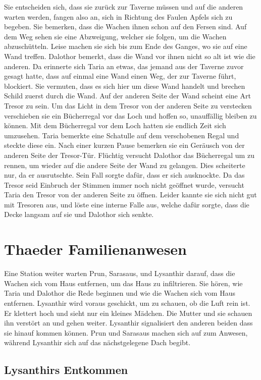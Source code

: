 \documentclass[10pt,twoside,twocolumn,openany]{book}
\begin{document}
	Sie entscheiden sich, dass sie zurück zur Taverne müssen und auf die anderen warten werden, fangen also an, sich in Richtung des Faulen Apfels sich zu begeben. Sie bemerken, dass die Wachen ihnen schon auf den Fersen sind. Auf dem Weg sehen sie eine Abzweigung, welcher sie folgen, um die Wachen abzuschütteln. Leise machen sie sich bis zum Ende des Ganges, wo sie auf eine Wand treffen. Dalothor bemerkt, dass die Wand vor ihnen nicht so alt ist wie die anderen. Da erinnerte sich Taria an etwas, das jemand aus der Taverne zuvor gesagt hatte, dass auf einmal eine Wand einen Weg, der zur Taverne führt, blockiert. Sie vermuten, dass es sich hier um diese Wand handelt und brechen Schild zuerst durch die Wand. Auf der anderen Seite der Wand scheint eine Art Tresor zu sein. Um das Licht in dem Tresor von der anderen Seite zu verstecken verschieben sie ein Bücherregal vor das Loch und hoffen so, unauffällig bleiben zu können. Mit dem Bücherregal vor dem Loch hatten sie endlich Zeit sich umzusehen. Taria bemerkte eine Schatulle auf dem verschobenen Regal und steckte diese ein. Nach einer kurzen Pause bemerken sie ein Geräusch von der anderen Seite der Tresor-Tür. Flüchtig versucht Dalothor das Bücherregal um zu rennen, um wieder auf die andere Seite der Wand zu gelangen. Dies scheiterte nur, da er ausrutschte. Sein Fall sorgte dafür, dass er sich ausknockte. Da das Tresor seid Einbruch der Stimmen immer noch nicht geöffnet wurde, versucht Taria den Tresor von der anderen Seite zu öffnen. Leider kannte sie sich nicht gut mit Tresoren aus, und löste eine interne Falle aus, welche dafür sorgte, dass die Decke langsam auf sie und Dalothor sich senkte. 
	
	\section{Thaeder Familienanwesen}
	
	Eine Station weiter warten Prun, Sarasaus, und Lysanthir darauf, dass die Wachen sich vom Haus entfernen, um das Haus zu infiltrieren. Sie hören, wie Taria und Dalothor die Rede beginnen und wie die Wachen sich vom Haus entfernen. Lysanthir wird voraus geschickt, um zu schauen, ob die Luft rein ist. Er klettert hoch und sieht nur ein kleines Mädchen. Die Mutter und sie schauen ihn verstört an und gehen weiter. Lysanthir signalisiert den anderen beiden dass sie hinauf kommen können. Prun und Sarasaus machen sich auf zum Anwesen, während Lysanthir sich auf das nächstgelegene Dach begibt. 
	
	\subsection{Lysanthirs Entkommen}
	
\end{document}
